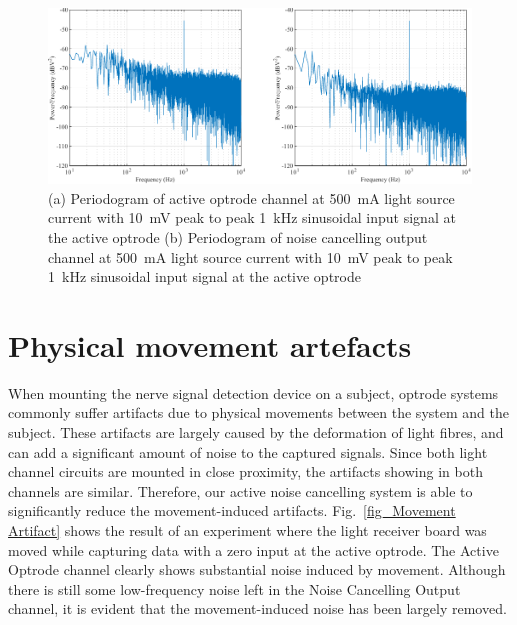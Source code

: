 \begin{figure}[H]
\centerline{\includegraphics[width=1\linewidth]{5-Experiment/Periodogram 500mA (10mV input).pdf}}
\caption{(a) Periodogram of active optrode channel at \qty{500}{\mA} light source current with \qty{10}{\mV} peak to peak \qty{1}{\kHz} sinusoidal input signal at the active optrode (b) Periodogram of noise cancelling output channel at \qty{500}{\mA} light source current with \qty{10}{\mV} peak to peak \qty{1}{\kHz} sinusoidal input signal at the active optrode}
\label{fig_Periodogram 500mA (10mV input)}
\end{figure}

\section{Physical movement artefacts}

When mounting the nerve signal detection device on a subject, optrode systems commonly suffer artifacts due to physical movements between the system and the subject.  These artifacts are largely caused by the deformation of light fibres, and can add a significant amount of noise to the captured signals.  Since both light channel circuits are mounted in close proximity, the artifacts showing in both channels are similar.  Therefore, our active noise cancelling system is able to significantly reduce the movement-induced artifacts.  Fig.~\ref{fig_Movement Artifact} shows the result of an experiment where the light receiver board was moved while capturing data with a zero input at the active optrode.  The Active Optrode channel clearly shows substantial noise induced by movement.  Although there is still some low-frequency noise left in the Noise Cancelling Output channel, it is evident that the movement-induced noise has been largely removed.

